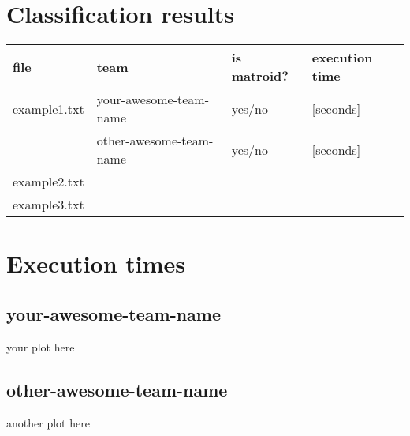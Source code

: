 \documentclass[11pt]{amsart}
\begin{document}
\section{Classification results}

\begin{center}
  \begin{tabular}[c]{llll}
    file
    & team
    & is matroid?
    & execution time
    \\\hline
    example1.txt 
    & your-awesome-team-name
    & yes/no
    & [seconds]
    \\
    & other-awesome-team-name
    & yes/no
    & [seconds]
    \\\hline
    example2.txt
    &
    \\\hline
    example3.txt
  \end{tabular}
\end{center}

\section{Execution times}

\subsection{your-awesome-team-name}

your plot here

\subsection{other-awesome-team-name}

another plot here
\end{document}
